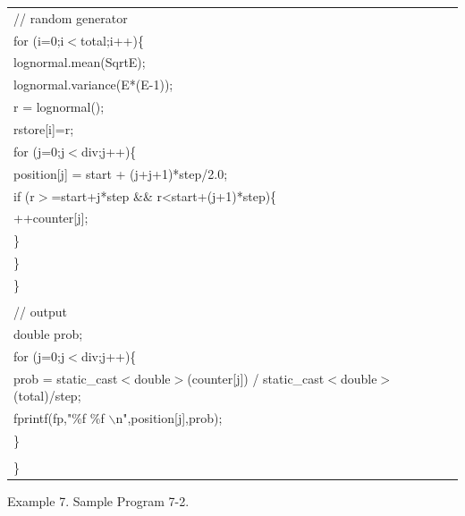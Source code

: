 {\footnotesize
\begin{center}
\begin{tabular}{|l|}\hline
\hspace*{10mm}// random generator\\
\hspace*{10mm}for (i=0;i$<$total;i++)\{\\
\hspace*{20mm}lognormal.mean(SqrtE);\\
\hspace*{20mm}lognormal.variance(E*(E-1));\\
\hspace*{20mm}r = lognormal();\\
\hspace*{20mm}rstore[i]=r;\\
\hspace*{20mm}for (j=0;j$<$div;j++)\{\\
\hspace*{30mm}position[j] = start + (j+j+1)*step/2.0;\\
\hspace*{30mm}if (r$>$=start+j*step \&\& r<start+(j+1)*step)\{\\
\hspace*{40mm}++counter[j];\\
\hspace*{30mm}\}\\
\hspace*{20mm}\}\\
\hspace*{10mm}\}\\
\\
\hspace*{10mm}// output\\
\hspace*{10mm}double prob;\\
\hspace*{10mm}for (j=0;j$<$div;j++)\{\\
\hspace*{20mm}prob = static\_cast$<$double$>$(counter[j]) / static\_cast$<$double$>$(total)/step;\\
\hspace*{20mm}fprintf(fp,"\%f \%f $\backslash$n",position[j],prob);\\
\hspace*{10mm}\}\\
\hspace*{\textwidth}\\
\}\\\hline
\end{tabular}
\vspace*{5mm}

{\small
Example 7. Sample Program 7-2.
}
\end{center}
}

